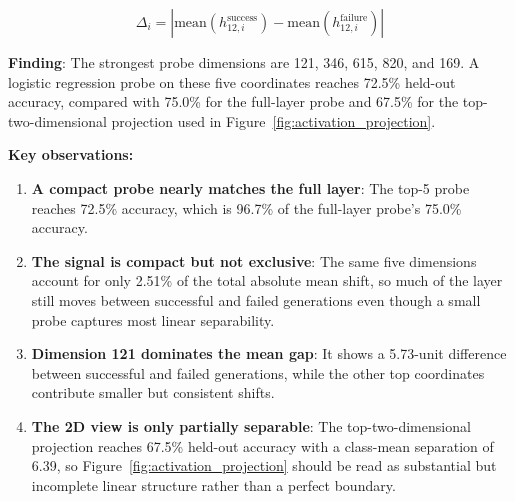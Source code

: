 \documentclass[preprint,12pt,authoryear]{elsarticle}
\begin{document}
\begin{equation}
\Delta_i = | \text{mean}(h_{12,i}^{\text{success}}) - \text{mean}(h_{12,i}^{\text{failure}}) |
\end{equation}

\textbf{Finding}: The strongest probe dimensions are 121, 346, 615, 820, and 169. A logistic regression probe on these five coordinates reaches 72.5\% held-out accuracy, compared with 75.0\% for the full-layer probe and 67.5\% for the top-two-dimensional projection used in Figure~\ref{fig:activation_projection}.

\begin{table}[t]
\centering
\caption{Top Discriminative Dimensions in Layer 12}
\label{tab:dimensions}
\footnotesize
\setlength{\tabcolsep}{4pt}
\end{table}

\textbf{Key observations:}

\begin{enumerate}
\item \textbf{A compact probe nearly matches the full layer}: The top-5 probe reaches 72.5\% accuracy, which is 96.7\% of the full-layer probe's 75.0\% accuracy.

\item \textbf{The signal is compact but not exclusive}: The same five dimensions account for only 2.51\% of the total absolute mean shift, so much of the layer still moves between successful and failed generations even though a small probe captures most linear separability.

\item \textbf{Dimension 121 dominates the mean gap}: It shows a 5.73-unit difference between successful and failed generations, while the other top coordinates contribute smaller but consistent shifts.

\item \textbf{The 2D view is only partially separable}: The top-two-dimensional projection reaches 67.5\% held-out accuracy with a class-mean separation of 6.39, so Figure~\ref{fig:activation_projection} should be read as substantial but incomplete linear structure rather than a perfect boundary.
\end{enumerate}
\end{document}
